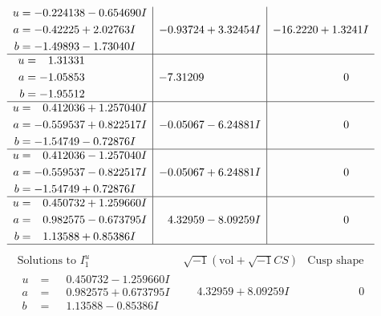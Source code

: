 \documentclass[1p]{elsarticle_modified}
\theoremstyle{definition}
\newcommand{\I}{\sqrt{-1}}
\begin{document}
$$\begin{array}{c|c|c}
\begin{aligned}
u &= -0.224138 - 0.654690 I \\
a &= -0.42225 + 2.02763 I \\
b &= -1.49893 - 1.73040 I\end{aligned}
 & -0.93724 + 3.32454 I & -16.2220 + 1.3241 I \\ \hline\begin{aligned}
u &= \phantom{-}1.31331\phantom{ +0.000000I} \\
a &= -1.05853\phantom{ +0.000000I} \\
b &= -1.95512\phantom{ +0.000000I}\end{aligned}
 & -7.31209\phantom{ +0.000000I} & \phantom{-0.000000 } 0 \\ \hline\begin{aligned}
u &= \phantom{-}0.412036 + 1.257040 I \\
a &= -0.559537 + 0.822517 I \\
b &= -1.54749 - 0.72876 I\end{aligned}
 & -0.05067 - 6.24881 I & \phantom{-0.000000 } 0 \\ \hline\begin{aligned}
u &= \phantom{-}0.412036 - 1.257040 I \\
a &= -0.559537 - 0.822517 I \\
b &= -1.54749 + 0.72876 I\end{aligned}
 & -0.05067 + 6.24881 I & \phantom{-0.000000 } 0 \\ \hline\begin{aligned}
u &= \phantom{-}0.450732 + 1.259660 I \\
a &= \phantom{-}0.982575 - 0.673795 I \\
b &= \phantom{-}1.13588 + 0.85386 I\end{aligned}
 & \phantom{-}4.32959 - 8.09259 I & \phantom{-0.000000 } 0\\
 \hline 
 \end{array}$$\newpage$$\begin{array}{c|c|c}  
\text{Solutions to }I^u_{1}& \I (\text{vol} + \sqrt{-1}CS) & \text{Cusp shape}\\
 \hline 
\begin{aligned}
u &= \phantom{-}0.450732 - 1.259660 I \\
a &= \phantom{-}0.982575 + 0.673795 I \\
b &= \phantom{-}1.13588 - 0.85386 I\end{aligned}
 & \phantom{-}4.32959 + 8.09259 I & \phantom{-0.000000 } 0 \\ \hline\begin{aligned}

\end{aligned}
\end{array}$$
\end{document}
